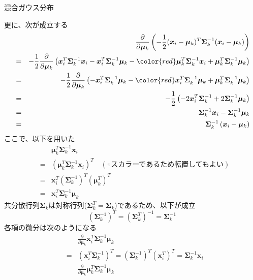 \documentclass[dvipdfmx,notheorems,t]{beamer}
\begin{document}
\begin{frame}{混合ガウス分布}
\begin{itemize}
\begin{itemize}
		更に、次が成立する
		\begin{eqnarray}
			&& \frac{\partial}{\partial \bm{\mu}_k} \left( -\frac{1}{2} (\bm{x}_i - \bm{\mu}_k)^T \bm{\Sigma}_k^{-1} (\bm{x}_i - \bm{\mu}_k) \right) \nonumber \\
			&=& -\frac{1}{2} \frac{\partial}{\partial \bm{\mu}_k} \left( \bm{x}_i^T \bm{\Sigma}_k^{-1} \bm{x}_i - \bm{x}_i^T \bm{\Sigma}_k^{-1} \bm{\mu}_k - \color{red} \bm{\mu}_k^T \bm{\Sigma}_k^{-1} \bm{x}_i \normalcolor + \bm{\mu}_k^T \bm{\Sigma}_k^{-1} \bm{\mu}_k \right) \nonumber \\
			&=& -\frac{1}{2} \frac{\partial}{\partial \bm{\mu}_k} \left( -\bm{x}_i^T \bm{\Sigma}_k^{-1} \bm{\mu}_k - \color{red} \bm{x}_i^T \bm{\Sigma}_k^{-1} \bm{\mu}_k \normalcolor + \bm{\mu}_k^T \bm{\Sigma}_k^{-1} \bm{\mu}_k \right) \nonumber \\
			&=& -\frac{1}{2} \left( -2 \bm{x}_i^T \bm{\Sigma}_k^{-1} + 2 \bm{\Sigma}_k^{-1} \bm{\mu}_k \right) \nonumber \\
			&=& \bm{\Sigma}_k^{-1} \bm{x}_i - \bm{\Sigma}_k^{-1} \bm{\mu}_k \nonumber \\
			&=& \bm{\Sigma}_k^{-1} \left( \bm{x}_i - \bm{\mu}_k \right)
		\end{eqnarray}
		ここで、以下を用いた
		\begin{eqnarray}
			&& \bm{\mu}_k^T \bm{\Sigma}_k^{-1} \bm{x}_i \nonumber \\
			&=& \left( \bm{\mu}_k^T \bm{\Sigma}_k^{-1} \bm{x}_i \right)^T \quad (\because \text{スカラーであるため転置してもよい}) \nonumber \\
			&=& \bm{x}_i^T \left( \bm{\Sigma}_k^{-1} \right)^T \left( \bm{\mu}_k^T \right)^T \nonumber \\
			&=& \bm{x}_i^T \bm{\Sigma}_k^{-1} \bm{\mu}_k
		\end{eqnarray}
		共分散行列$\bm{\Sigma}_k$は対称行列($\bm{\Sigma}_k^T = \bm{\Sigma}_k$)であるため、以下が成立
		\begin{equation}
			\left( \bm{\Sigma}_k^{-1} \right)^T = \left( \bm{\Sigma}_k^T \right)^{-1} = \bm{\Sigma}_k^{-1}
		\end{equation}
		各項の微分は次のようになる
		\begin{eqnarray}
			&& \frac{\partial}{\partial \bm{\mu}_k} \bm{x}_i^T \bm{\Sigma}_k^{-1} \bm{\mu}_k \nonumber \\
			&=& \left( \bm{x}_i^T \bm{\Sigma}_k^{-1} \right)^T = \left( \bm{\Sigma}_k^{-1} \right)^T \left( \bm{x}_i^T \right)^T = \bm{\Sigma}_k^{-1} \bm{x}_i \\
			&& \frac{\partial}{\partial \bm{\mu}_k} \bm{\mu}_k^T \bm{\Sigma}_k^{-1} \bm{\mu}_k \nonumber \\

\end{eqnarray}
\end{itemize}
\end{itemize}
\end{frame}
\end{document}
